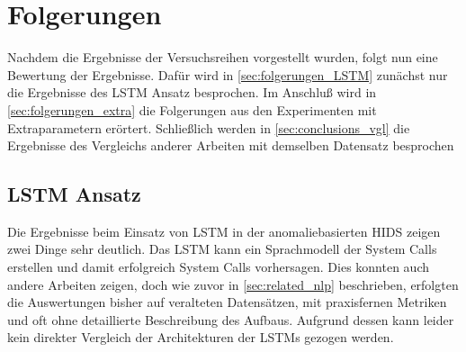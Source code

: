 \chapter{Folgerungen}\label{ch:folgerungen}
Nachdem die Ergebnisse der Versuchsreihen vorgestellt wurden, folgt nun eine Bewertung der Ergebnisse.
Dafür wird in \autoref{sec:folgerungen_LSTM} zunächst nur die Ergebnisse des \ac{LSTM} Ansatz besprochen.
Im Anschluß wird in \autoref{sec:folgerungen_extra} die Folgerungen aus den Experimenten mit Extraparametern erörtert. 
Schließlich werden in \autoref{sec:conclusions_vgl} die Ergebnisse des Vergleichs anderer Arbeiten mit demselben Datensatz besprochen

\section{LSTM Ansatz}\label{sec:folgerungen_LSTM}

Die Ergebnisse beim Einsatz von \ac{LSTM} in der anomaliebasierten \ac{HIDS} zeigen zwei Dinge sehr deutlich.
Das \ac{LSTM} kann ein Sprachmodell der System Calls erstellen und damit erfolgreich System Calls vorhersagen.
Dies konnten auch andere Arbeiten zeigen, doch wie zuvor in \autoref{sec:related_nlp} beschrieben, erfolgten die Auswertungen bisher auf veralteten Datensätzen, mit praxisfernen Metriken und oft ohne detaillierte Beschreibung des Aufbaus.
Aufgrund dessen kann leider kein direkter Vergleich der Architekturen der \acp{LSTM} gezogen werden.

